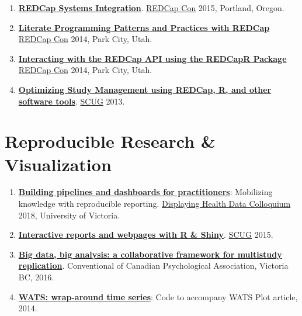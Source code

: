 \documentclass[
]{book}
\providecommand{\tightlist}{%
  \setlength{\itemsep}{0pt}\setlength{\parskip}{0pt}}
\begin{document}
\begin{enumerate}
\def\labelenumi{\arabic{enumi}.}
\tightlist
\item
  \textbf{\href{https://github.com/OuhscBbmc/BbmcResources/blob/master/Publications/Presentation2015-09-REDCapCon/REDCapIntegration.pdf}{REDCap Systems Integration}}. \href{https://projectredcap.org/about/redcapcon/}{REDCap Con} 2015, Portland, Oregon.
\item
  \textbf{\href{https://github.com/OuhscBbmc/RedcapExamplesAndPatterns/blob/master/Publications/Presentation-2014-09-REDCapCon/LiterateProgrammingPatternsAndPracticesWithREDCap.pptx}{Literate Programming Patterns and Practices with REDCap}} \href{https://projectredcap.org/about/redcapcon/}{REDCap Con} 2014, Park City, Utah.
\item
  \textbf{\href{https://github.com/OuhscBbmc/RedcapExamplesAndPatterns/blob/master/Publications/Presentation-2014-09-REDCapCon/REDCapR.pptx}{Interacting with the REDCap API using the REDCapR Package}} \href{https://projectredcap.org/about/redcapcon/}{REDCap Con} 2014, Park City, Utah.
\item
  \textbf{\href{https://github.com/OuhscBbmc/StatisticalComputing/blob/master/2013_Presentations/03_March/RedcapForUserGroup.pptx}{Optimizing Study Management using REDCap, R, and other software tools}}. \href{https://github.com/OuhscBbmc/StatisticalComputing}{SCUG} 2013.
\end{enumerate}

\hypertarget{reproducible-research-visualization}{%
\section{Reproducible Research \& Visualization}\label{reproducible-research-visualization}}

\begin{enumerate}
\def\labelenumi{\arabic{enumi}.}
\tightlist
\item
  \textbf{\href{https://github.com/dss-ialh/displaying-health-data/blob/master/documentation/products/beasley/dhd-2018-uvic-3-a-beasley-2018-11-29.pdf}{Building pipelines and dashboards for practitioners}}: Mobilizing knowledge with reproducible reporting. \href{https://github.com/dss-ialh/displaying-health-data}{Displaying Health Data Colloquium} 2018, University of Victoria.
\item
  \textbf{\href{https://rawgit.com/OuhscBbmc/StatisticalComputing/master/2015_Presentations/10_October/beasley-scug-shiny-2015-10.html\#/}{Interactive reports and webpages with R \& Shiny}}. \href{https://github.com/OuhscBbmc/StatisticalComputing}{SCUG} 2015.
\item
  \textbf{\href{https://github.com/IALSA/IALSA-2015-Portland/blob/master/pubs/2016-talks/2016-06-09-cpa/ppt/koval-etal-2016-06-10-cpa.pdf}{Big data, big analysis: a collaborative framework for multistudy replication}}. Conventional of Canadian Psychological Association, Victoria BC, 2016.
\item
  \textbf{\href{https://github.com/OuhscBbmc/Wats}{WATS: wrap-around time series}}: Code to accompany WATS Plot article, 2014.
\end{enumerate}
\end{document}
